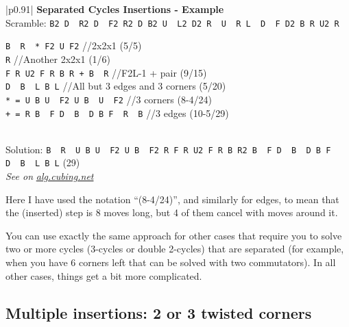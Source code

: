 \documentclass[11pt,a4paper]{book}
\newcommand{\p}{\textquotesingle}
\newcommand{\m}{\texttt}
\newcommand{\ps}{\p\,\,}
\newcommand{\comment}[1]{{\color{gray}\quad//#1}}
\begin{document}
\bigskip
\begin{tabular}{|p{}|}
\hline
\textbf{Separated Cycles Insertions - Example}\\
\hline
Scramble: \m{B2 D\ps R2 D\ps F2 R2 D B2 U\ps L2 D2 R\ps U\ps R L\ps D\ps F D2 B R U2 R\p}\\
\hline
\begin{minipage}[l]{0.650\textwidth}
\m{B\ps R\ps * F2 U F2} \comment{2x2x1 (5/5)}\\
\m R \comment{Another 2x2x1 (1/6)}\\
\m{F R U2 F R B R + B\ps R} \comment{F2L-1 + pair (9/15)}\\
\m{D\ps B\ps L B L\p} \comment{All but 3 edges and 3 corners (5/20)}\\
\m{* = U B U\ps F2 U B\ps U\ps F2} \comment{3 corners (8-4/24)}\\
\m{+ = R B\ps F D\ps B\ps D B F\ps R\ps B} \comment{3 edges (10-5/29)}
\end{minipage}
\begin{minipage}[c]{0.25\textwidth}

\end{minipage}\\
\hline
Solution: \m{B\ps R\ps U B U\ps F2 U B\ps F2 R F R U2 F R B R2 B\ps F D\ps B\ps D B F\ps D\ps B\ps L B L\p} (29)\\
\hline
\emph{See on }\href{https://alg.cubing.net/?alg=B-_R-_(U_B_U-_F2_U_B-_U-_F2)_F2_U_F2_\%2F\%2F2x2x1_(5\%2F5)\%0AR_\%2F\%2FAnother_2x2x1_(1\%2F6)\%0AF_R_U2_F_R_B_R_(R_B-_F_D-_B-_D_B_F-_R-_B)_B-_R_\%2F\%2FF2L\%26\%2345\%3B1_\%26\%232b\%3B_pair_(9\%2F15)\%0AD-_B-_L_B_L-_\%2F\%2FAll_but_3_edges_and_3_corners_(5\%2F20)\%0A\%0A&setup=B2_D-_R2_D-_F2_R2_D_B2_U-_L2_D2_R-_U-_R_L-_D-_F_D2_B_R_U2_R-}{\emph{alg.cubing.net}}\\
\hline
\end{tabular}
\bigskip

Here I have used the notation ``(8-4/24)'', and similarly for edges, to mean that the (inserted) step is 8 moves long, but 4 of them cancel with moves around it.

You can use exactly the same approach for other cases that require you to solve two or more cycles (3-cycles or double 2-cycles) that are separated (for example, when you have 6 corners left that can be solved with two commutators). In all other cases, things get a bit more complicated.

\subsection{Multiple insertions: 2 or 3 twisted corners}
\end{document}
